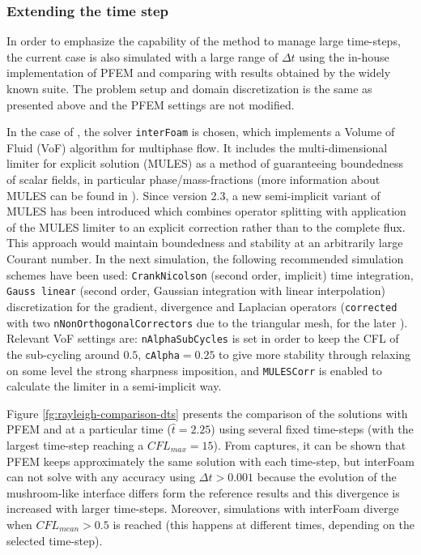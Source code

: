 \subsubsection{Extending the time step}

In order to emphasize the capability of the method to manage large time-steps, the current case is also simulated with a large range of $\Delta t$ using the in-house implementation of PFEM and comparing with results obtained by the widely known \OF suite. The problem setup and domain discretization is the same as presented above and the PFEM settings are not modified.

In the case of \OF, the solver \texttt{interFoam} is chosen, which implements a Volume of Fluid (VoF) algorithm for multiphase flow\cite{Berberovic09}. It includes the multi-dimensional limiter for explicit solution (MULES) as a method of guaranteeing boundedness of scalar fields, in particular phase/mass-fractions (more information about MULES can be found in \cite{Marquez13}). Since \OF version 2.3, a new semi-implicit variant of MULES has been introduced which combines operator splitting with application of the MULES limiter to an explicit correction rather than to the complete flux. This approach would maintain boundedness and stability at an arbitrarily large Courant number. In the next simulation, the following recommended simulation schemes have been used: \texttt{CrankNicolson} (second order, implicit) time integration, \texttt{Gauss linear} (second order, Gaussian integration with linear interpolation) discretization for the gradient, divergence and Laplacian operators (\texttt{corrected} with two \texttt{nNonOrthogonalCorrectors} due to the triangular mesh, for the later ). Relevant VoF settings are: \texttt{nAlphaSubCycles} is set in order to keep the CFL of the sub-cycling around $0.5$, \texttt{cAlpha}$=0.25$ to give more stability through relaxing on some level the strong sharpness imposition, and \texttt{MULESCorr} is enabled to calculate the limiter in a semi-implicit way.

Figure \ref{fg:rayleigh-comparison-dts} presents the comparison of the solutions with PFEM and \OF at a particular time ($\widehat{t}=2.25$) using several fixed time-steps (with the largest time-step reaching a $CFL_{max}=15$). From captures, it can be shown that PFEM keeps approximately the same solution with each time-step, but interFoam can not solve with any accuracy using $\Delta t>0.001$ because the evolution of the mushroom-like interface differs form the reference results and this divergence is increased with larger time-steps. Moreover, simulations with interFoam diverge when $CFL_{mean}>0.5$ is reached (this happens at different times, depending on the selected time-step).

